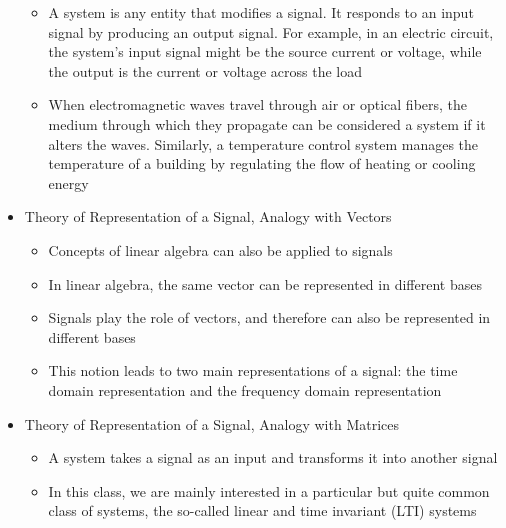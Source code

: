 \begin{itemize}
    \begin{itemize}

      \item A system is any entity that modifies a signal. It responds to an input signal by producing an output signal. For example, in an electric circuit, the system's input signal might be the source current or voltage, while the output is the current or voltage across the load

      \item When electromagnetic waves travel through air or optical fibers, the medium through which they propagate can be considered a system if it alters the waves. Similarly, a temperature control system manages the temperature of a building by regulating the flow of heating or cooling energy

    \end{itemize}

  \item Theory of Representation of a Signal, Analogy with Vectors

    \begin{itemize}

      \item Concepts of linear algebra can also be applied to signals

      \item In linear algebra, the same vector can be represented in different bases

      \item Signals play the role of vectors, and therefore can also be represented in different bases

      \item This notion leads to two main representations of a signal: the time domain representation and the frequency domain representation

    \end{itemize}

  \item Theory of Representation of a Signal, Analogy with Matrices

    \begin{itemize}

      \item A system takes a signal as an input and transforms it into another signal

      \item In this class, we are mainly interested in a particular but quite common class of systems, the so-called linear and time invariant (LTI) systems


\end{itemize}
\end{itemize}
